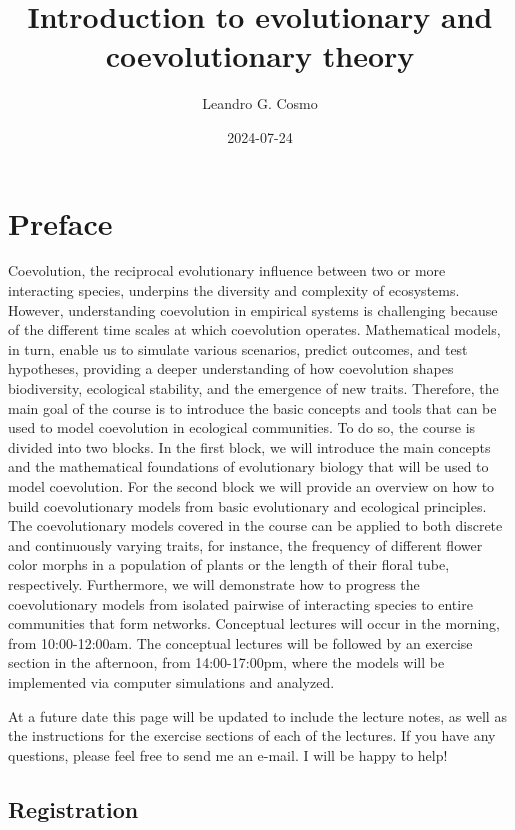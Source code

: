 \documentclass[
]{book}
\title{Introduction to evolutionary and coevolutionary theory}
\author{Leandro G. Cosmo}
\date{2024-07-24}
\begin{document}
\maketitle

{
\setcounter{tocdepth}{1}
\tableofcontents
}
\hypertarget{preface}{%
\chapter{Preface}\label{preface}}

Coevolution, the reciprocal evolutionary influence between two or more interacting species, underpins the diversity and complexity of ecosystems. However, understanding coevolution in empirical systems is challenging because of the different time scales at which coevolution operates. Mathematical models, in turn, enable us to simulate various scenarios, predict outcomes, and test hypotheses, providing a deeper understanding of how coevolution shapes biodiversity, ecological stability, and the emergence of new traits. Therefore, the main goal of the course is to introduce the basic concepts and tools that can be used to model coevolution in ecological communities. To do so, the course is divided into two blocks. In the first block, we will introduce the main concepts and the mathematical foundations of evolutionary biology that will be used to model coevolution. For the second block we will provide an overview on how to build coevolutionary models from basic evolutionary and ecological principles. The coevolutionary models covered in the course can be applied to both discrete and continuously varying traits, for instance, the frequency of different flower color morphs in a population of plants or the length of their floral tube, respectively. Furthermore, we will demonstrate how to progress the coevolutionary models from isolated pairwise of interacting species to entire communities that form networks. Conceptual lectures will occur in the morning, from 10:00-12:00am. The conceptual lectures will be followed by an exercise section in the afternoon, from 14:00-17:00pm, where the models will be implemented via computer simulations and analyzed.

At a future date this page will be updated to include the lecture notes, as well as the instructions for the exercise sections of each of the lectures. If you have any questions, please feel free to send me an e-mail. I will be happy to help!

\hypertarget{registration}{%
\section{Registration}\label{registration}}
\end{document}
